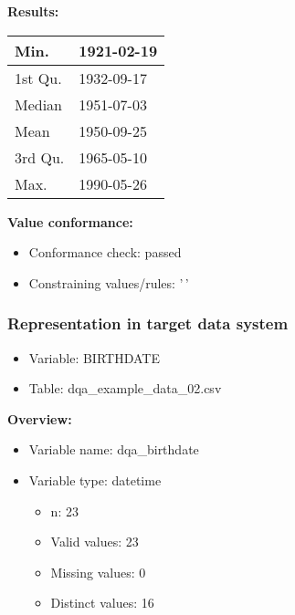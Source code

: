 \documentclass[
]{article}
\providecommand{\tightlist}{%
  \setlength{\itemsep}{0pt}\setlength{\parskip}{0pt}}
\begin{document}
\textbf{Results:}\\

\begin{table}[H]
\centering
\begin{tabular}{l|l}
\hline
Min. & 1921-02-19\\
\hline
1st Qu. & 1932-09-17\\
\hline
Median & 1951-07-03\\
\hline
Mean & 1950-09-25\\
\hline
3rd Qu. & 1965-05-10\\
\hline
Max. & 1990-05-26\\
\hline
\end{tabular}
\end{table}

\textbf{Value conformance:}

\begin{itemize}
\tightlist
\item
  Conformance check: passed
\item
  Constraining values/rules: '\,'
\end{itemize}

\newpage

\hypertarget{representation-in-target-data-system-2}{%
\subsubsection{\texorpdfstring{Representation in \textbf{target} data
system}{Representation in target data system}}\label{representation-in-target-data-system-2}}

\begin{itemize}
\tightlist
\item
  Variable: BIRTHDATE
\item
  Table: dqa\_example\_data\_02.csv
\end{itemize}

\textbf{Overview:}

\begin{itemize}
\tightlist
\item
  Variable name: dqa\_birthdate
\item
  Variable type: datetime

  \begin{itemize}
  \tightlist
  \item
    n: 23
  \item
    Valid values: 23
  \item
    Missing values: 0
  \item
    Distinct values: 16
  \end{itemize}
\end{itemize}
\end{document}
